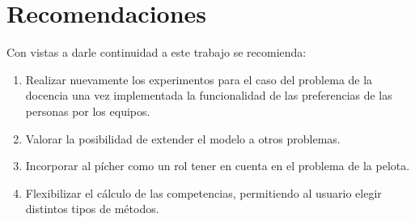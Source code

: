 \chapter*{Recomendaciones}
Con vistas a darle continuidad a este trabajo se recomienda: 
\begin{enumerate}
	\item Realizar nuevamente los experimentos para el caso del problema de la docencia una vez implementada la funcionalidad de las preferencias de las personas por los equipos.
	\item Valorar la posibilidad de extender el modelo a otros problemas.
	\item Incorporar al pícher como un rol tener en cuenta en el problema de la pelota.
	\item Flexibilizar el cálculo de las competencias, permitiendo al usuario elegir distintos tipos de métodos.
\end{enumerate}